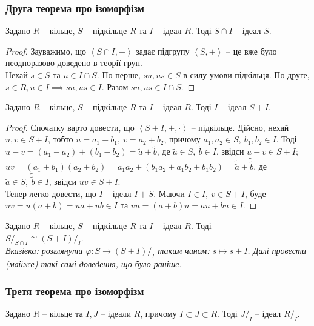 \documentclass{math_library}
\begin{document}
\subsubsection{Друга теорема про ізоморфізм}
\begin{lemma}
Задано $R$ -- кільце, $S$ -- підкільце $R$ та $I$ -- ідеал $R$. Тоді $S \cap I$ -- ідеал $S$.
\end{lemma}

\begin{proof}
Зауважимо, що $\left< S \cap I, + \right>$ задає підгрупу $\left< S, + \right>$ -- це вже було неодноразово доведено в теорії груп.\\
Нехай $s \in S$ та $u \in I \cap S$. По-перше, $su, us \in S$ в силу умови підкільця. По-друге, $s \in R, u \in I \implies su, us \in I$. Разом $su, us \in I \cap S$.
\end{proof}

\begin{lemma}
Задано $R$ -- кільце, $S$ -- підкільце $R$ та $I$ -- ідеал $R$. Тоді $I$ -- ідеал $S+I$.
\end{lemma}

\begin{proof}
Спочатку варто довести, що $\left< S+I,+,\cdot \right>$ -- підкільце. Дійсно, нехай $u,v \in S+I$, тобто $u = a_1+b_1,\ v = a_2+b_2$, причому $a_1,a_2 \in S,\ b_1,b_2 \in I$. Тоді\\
$u - v = (a_1 - a_2) + (b_1 - b_2) = \tilde{a} + \tilde{b}$, де $\tilde{a} \in S,\ \tilde{b} \in I$, звідси $u - v \in S + I$;\\
$uv = (a_1+b_1)(a_2+b_2) = a_1a_2 + (b_1a_2 + a_1b_2 + b_1b_2) = \tilde{\tilde{a}} + \tilde{\tilde{b}}$, де $\tilde{\tilde{a}} \in S,\ \tilde{\tilde{b}} \in I$, звідси $uv \in S + I$.\\
Тепер легко довести, що $I$ -- ідеал $I+S$. Маючи $I \in I,\ v \in S+I$, буде $uv = u(a+b) = ua + ub \in I$ та $vu = (a+b)u = au + bu \in I$.
\end{proof}

\begin{theorem}
Задано $R$ -- кільце, $S$ -- підкільце $R$ та $I$ -- ідеал $R$. Тоді\\
$S/_{S \cap I} \cong (S+I)/_{I}$.\\
\textit{Вказівка: розглянути $\varphi \colon S \to (S+I)/_I$ таким чином: $s \mapsto s+I$. Далі провести (майже) такі самі доведення, що було раніше.}
\end{theorem}

\subsubsection{Третя теорема про ізоморфізм}
\begin{lemma}
Задано $R$ -- кільце та $I,J$ -- ідеали $R$, причому $I \subset J \subset R$. Тоді $J/_I$ -- ідеал $R/_I$.
\end{lemma}
\end{document}
